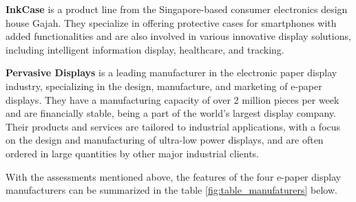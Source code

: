 \documentclass[../Main.tex]{subfiles}
\begin{document}
\textbf{InkCase} is a product line from the Singapore-based consumer electronics design house Gajah. They specialize in offering protective cases for smartphones with added functionalities and are also involved in various innovative display solutions, including intelligent information display, healthcare, and tracking. 

\textbf{Pervasive Displays} is a leading manufacturer in the electronic paper display industry, specializing in the design, manufacture, and marketing of e-paper displays. They have a manufacturing capacity of over 2 million pieces per week and are financially stable, being a part of the world's largest display company. Their products and services are tailored to industrial applications, with a focus on the design and manufacturing of ultra-low power displays, and are often ordered in large quantities by other major industrial clients.

With the assessments mentioned above, the features of the four e-paper display manufacturers can be summarized in the table \ref{fig:table_manufaturers} below.
\end{document}
